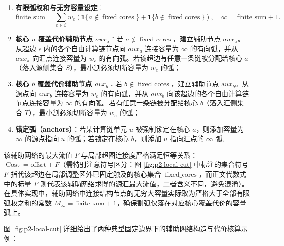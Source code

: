 \documentclass[anonymous,notoc]{gmcm2026}
\providecommand{\tightlist}{\setlength{\itemsep}{0pt}\setlength{\parskip}{0pt}}
\begin{document}
\begin{enumerate}
\def\labelenumi{\arabic{enumi}.}
\tightlist
\item
  \textbf{有限弧权和与无穷容量设定}： \begin{equation}
\text{finite\_sum} = \sum_{e \in \mathcal{E}} w_e \left( \mathbf{1}\{a \notin \operatorname{fixed\_cores}\} + \mathbf{1}\{b \notin \operatorname{fixed\_cores}\} \right), \quad \infty = \text{finite\_sum} + 1.
\end{equation}
\item
  \textbf{核心 \(a\) 覆盖代价辅助节点 \(aux_a\)}：若 \(a \notin \operatorname{fixed\_cores}\)，建立辅助节点 \(aux_a\)。从超边 \(e\) 内的各个自由计算链节点向 \(aux_a\) 连接容量为 \(\infty\) 的有向弧，并从 \(aux_a\) 向汇点连接容量为 \(w_e\) 的有向弧。若该超边有任意一条链被分配给核心 \(a\)（落入源侧集合 \(S\)），最小割必须切断容量为 \(w_e\) 的弧；
\item
  \textbf{核心 \(b\) 覆盖代价辅助节点 \(aux_b\)}：若 \(b \notin \operatorname{fixed\_cores}\)，建立辅助节点 \(aux_b\)。从源点向 \(aux_b\) 连接容量为 \(w_e\) 的有向弧，并从 \(aux_b\) 向该超边的各个自由计算链节点连接容量为 \(\infty\) 的有向弧。若有任意一条链被分配给核心 \(b\)（落入汇侧集合 \(T\)），最小割必须切断容量为 \(w_e\) 的弧；
\item
  \textbf{锚定弧（anchors）}：若某计算链单元 \(u\) 被强制锁定在核心 \(a\)，则添加容量为 \(\infty\) 的源点指向 \(u\) 的弧；若锁定在核心 \(b\)，则添加 \(u\) 指向汇点的 \(\infty\) 弧。
\end{enumerate}

该辅助网络的最大流值 \(F\) 与局部超图连接度严格满足恒等关系：\(\operatorname{Cost} = \text{offset} + F\)（需特别注意符号区分：图 \ref{fig:p2-local-cut} 中标注的集合符号 \(F\) 指代该超边在局部调整区外已固定触及的核心集合 \(\operatorname{fixed\_cores}\)，而正文代数式中的标量 \(F\) 则代表该辅助网络求得的源汇最大流值，二者含义不同，避免混淆）。在具体实现中，辅助网络中连接结构节点的无穷大容量实际取为严格大于全部有限弧权之和的常数 \(M_\infty = \text{finite\_sum} + 1\)，确保割弧仅落在对应核心覆盖代价的容量弧上。

图 \ref{fig:p2-local-cut} 详细给出了两种典型固定边界下的辅助网络构造与代价核算示例：
\end{document}
